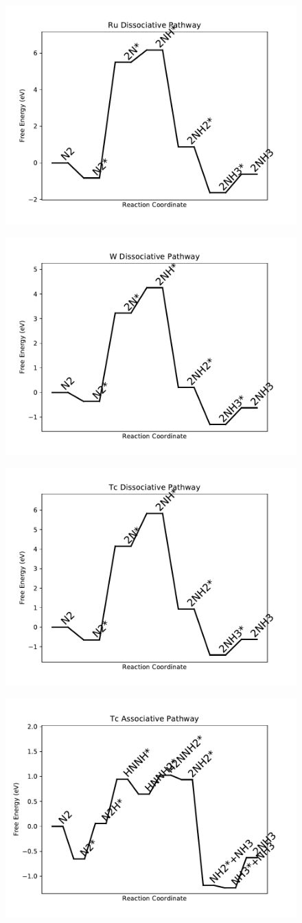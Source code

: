 \documentclass[journal=jacsat,manuscript=article]{achemso}
\begin{document}
\newpage
\begin{figure}
\includegraphics[width=0.5\linewidth]{data/plots/Ru_dissociative.pdf}
\label{fig:Ru_dissociative}
\end{figure}

\begin{figure}
\includegraphics[width=0.5\linewidth]{data/plots/W_dissociative.pdf}
\label{fig:W_dissociative}
\end{figure}

\newpage
\begin{figure}
\includegraphics[width=0.5\linewidth]{data/plots/Tc_dissociative.pdf}
\label{fig:Tc_dissociative}
\end{figure}

\begin{figure}
\includegraphics[width=0.5\linewidth]{data/plots/Tc_associative.pdf}
\label{fig:Tc_associative}
\end{figure}
\end{document}
